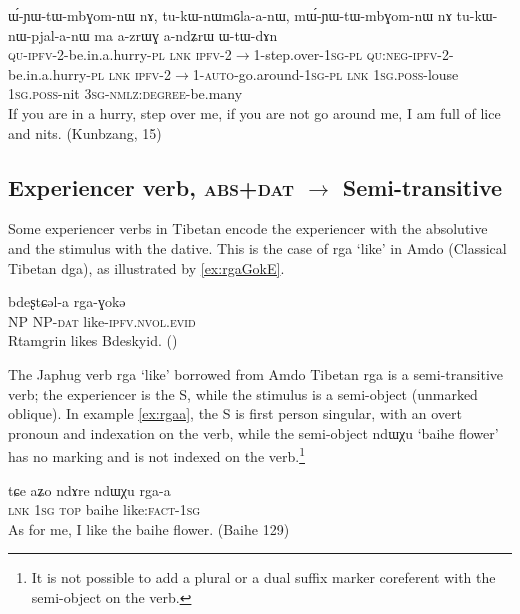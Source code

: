 \documentclass[oldfontcommands,oneside,a4paper,11pt]{article}
\newcommand{\ipa}[1]{{\phon \mbox{#1}}} %
\begin{document}
\begin{exe}
\ex \label{ex:tukWnWpjalanW}
\gll
\ipa{ɯ́-ɲɯ-tɯ-mbɣom-nɯ}  	\ipa{nɤ,}  	\ipa{tu-kɯ-nɯmɢla-a-nɯ,}  \ipa{mɯ́-ɲɯ-tɯ-mbɣom-nɯ}  	\ipa{nɤ}  	\ipa{tu-kɯ-nɯ-pjal-a-nɯ}  	\ipa{ma}  	\ipa{a-zrɯɣ}  	\ipa{a-ndʑrɯ}  	\ipa{ɯ-tɯ-dɤn} \\
\textsc{qu-ipfv}-2-be.in.a.hurry-\textsc{pl} \textsc{lnk} \textsc{ipfv}-2$\rightarrow$1-step.over-\textsc{1sg-pl} \textsc{qu:neg-ipfv}-2-be.in.a.hurry-\textsc{pl} \textsc{lnk} \textsc{ipfv}-2$\rightarrow$1-\textsc{auto}-go.around-\textsc{1sg-pl} \textsc{lnk}   \textsc{1sg.poss}-louse \textsc{1sg.poss}-nit \textsc{3sg-nmlz:degree}-be.many \\
\glt If you are in a hurry, step over me, if you are not go around me, I am full of lice and nits. (Kunbzang, 15)
\end{exe}


\subsection{Experiencer verb, \textsc{abs+dat} $\rightarrow$ Semi-transitive}
Some experiencer verbs in Tibetan encode the experiencer with the absolutive and the stimulus with the dative. This is the case of \ipa{rga} `like' in Amdo (Classical Tibetan \ipa{dga}), as illustrated by \ref{ex:rgaGokE}.

\begin{exe}
\ex \label{ex:rgaGokE}
\gll \ipa{ʂtamɖʐən}  \ipa{bdeʂtɕəl-a}  \ipa{rga-ɣokə} \\
NP NP-\textsc{dat} like-\textsc{ipfv.nvol.evid} \\
\glt Rtamgrin likes Bdeskyid. (\citealt[123:547]{haller04themchen})
\end{exe}

The Japhug verb \ipa{rga} `like' borrowed from Amdo Tibetan \ipa{rga} is a semi-transitive verb; the experiencer is the S, while the stimulus is a semi-object (unmarked oblique). In example \ref{ex:rgaa}, the S is first person singular,  with an overt pronoun and indexation on the verb, while the semi-object \ipa{ndɯχu} `baihe flower' has no marking and is not indexed on the verb.\footnote{It is not possible to add a plural or a dual suffix marker coreferent with the semi-object on the verb.}  

\begin{exe}
\ex \label{ex:rgaa}
\gll
\ipa{tɕe} 	\ipa{aʑo} 	\ipa{ndɤre} 	\ipa{ndɯχu} 	\ipa{rga-a} \\
\textsc{lnk} \textsc{1sg} \textsc{top} baihe like:\textsc{fact}-\textsc{1sg} \\
\glt As for me, I like the baihe flower.
(Baihe 129)
\end{exe}
\end{document}
